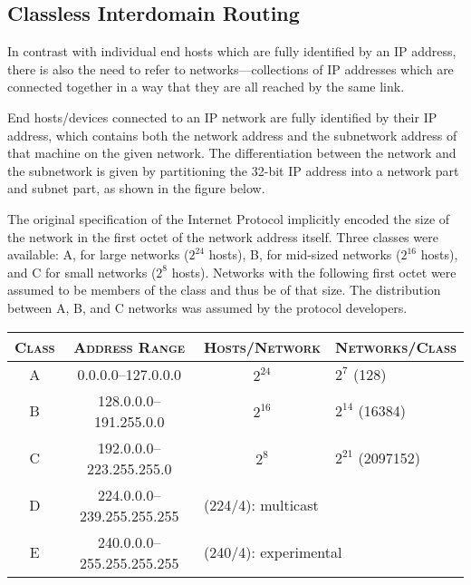 \subsection{Classless Interdomain Routing}

In contrast with individual end hosts which are fully identified by an IP address, there is also the need to refer to networks---collections of IP addresses which are connected together in a way that they are all reached by the same link.


End hosts/devices connected to an IP network are fully identified by their IP address, which contains both the network address and the subnetwork address of that machine on the given network. The differentiation between the network and the subnetwork is given by partitioning the 32-bit IP address into a network part and subnet part, as shown in the figure below.

The original specification of the Internet Protocol implicitly encoded the size of the network in the first octet of the network address itself. Three classes were available: A, for large networks ($2^{24}$ hosts), B, for mid-sized networks ($2^{16}$ hosts), and C for small networks ($2^{8}$ hosts). Networks with the following first octet were assumed to be members of the class and thus be of that size. The distribution between A, B, and C networks was assumed by the protocol developers.


\begin{tabular}{ c | c | c | l }
    \textsc{Class} & \textsc{Address Range} & \textsc{Hosts/Network} & \textsc{Networks/Class} \\
    \hline
	A & 0.0.0.0--127.0.0.0         & $2^{24}$ & $2^{7}$ (128)               \\
	B & 128.0.0.0--191.255.0.0     & $2^{16}$ & $2^{14}$ (16384)            \\
	C & 192.0.0.0--223.255.255.0   & $2^{8}$  & $2^{21}$ (2097152)          \\
	D & 224.0.0.0--239.255.255.255 & \multicolumn{2}{l}{(224/4): multicast} \\
	E & 240.0.0.0--255.255.255.255 & \multicolumn{2}{l}{(240/4): experimental}
\end{tabular}

